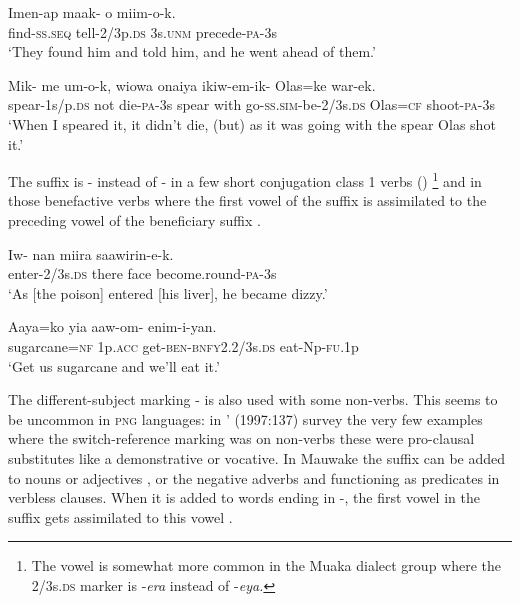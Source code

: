 \ea%
\label{ex:3:x244}
\gll Imen-ap maak- o miim-o-k. \\
find-\textsc{ss}.\textsc{seq} tell-2/3p.\textsc{ds} 3s.\textsc{unm} precede-\textsc{pa}-3s \\
\glt`They found him and told him, and he went ahead of them.' 
\z

\ea%
\label{ex:3:x245}
\gll Mik- me um-o-k, wiowa onaiya ikiw-em-ik- Olas=ke war-ek.\\
spear-1s/p.\textsc{ds} not die-\textsc{pa}-3s spear with go-\textsc{ss}.\textsc{sim}-be-2/3s.\textsc{ds} Olas=\textsc{cf} shoot-\textsc{pa}-3s\\
\glt`When I speared it, it didn't die, (but) as it was going with the spear Olas shot it.'
\z

The suffix is - instead of \nobreakdash- in a few short conjugation class 1 verbs () \footnote{The vowel  is somewhat more common in the Muaka dialect group where the 2/3s.\textsc{ds} marker is -\textit{era} instead of \nobreakdash-\textit{eya.}} and in those benefactive verbs where the first vowel of the suffix is assimilated to the preceding vowel of the beneficiary suffix . 

\ea%
\label{ex:3:x493}
\gll Iw- nan miira saawirin-e-k. \\
enter-2/3s.\textsc{ds} there face become.round-\textsc{pa}-3s\\
\glt`As [the poison] entered [his liver], he became dizzy.'
\z

\ea%
\label{ex:3:x695}
\gll Aaya=ko yia aaw-om- enim-i-yan. \\
sugarcane=\textsc{nf} 1p.\textsc{acc} get-\textsc{ben}-\textsc{bnfy}2.2/3s.\textsc{ds} eat-Np-\textsc{fu}.1p\\
\glt`Get us sugarcane and we'll eat it.'
\z

The different-subject marking \nobreakdash- is also used with some non-verbs. This seems to be uncommon in \textsc{png} languages: in \citeauthor{Roberts1997}' (1997:137) survey the very few examples where the switch-reference marking was on non-verbs these were pro-clausal substitutes like a demonstrative or vocative. In Mauwake the  suffix can be added to nouns  or adjectives , or the negative adverbs  and   functioning as predicates in verbless clauses. When it is added to words ending in -, the first vowel in the suffix gets assimilated to this vowel .

